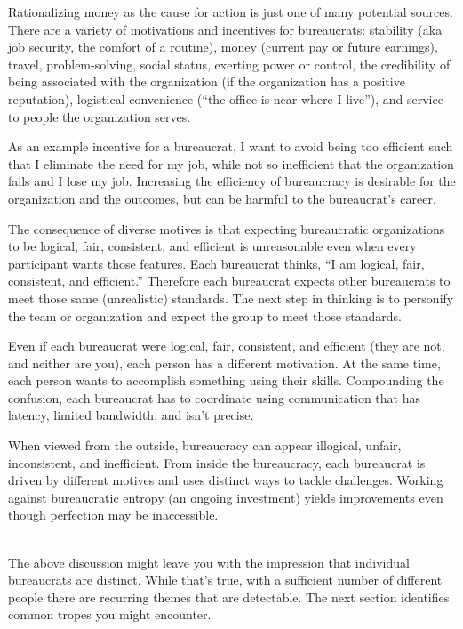 Rationalizing money as the cause for action is just one of many potential sources.
There are a variety of motivations and incentives for bureaucrats: 
stability (aka job security, the comfort of a routine),
money (current pay or future earnings), 
travel, 
problem-solving, 
social status, 
exerting power or control, 
the credibility of being associated with the organization (if the organization has a positive reputation), 
logistical convenience (``the office is near where I live''), and
service to people the organization serves.


As an example incentive for a bureaucrat, I want to avoid being too efficient such that I eliminate the need for my job, 
%
while not so inefficient that the organization fails and I lose my job. Increasing the efficiency of bureaucracy is desirable for the organization and the outcomes, but can be harmful to the bureaucrat's career.


The consequence of diverse motives is that expecting bureaucratic organizations to be logical, fair, consistent, and efficient is unreasonable even when every participant wants those features. Each bureaucrat thinks, ``I am logical, fair, consistent, and efficient.'' Therefore each bureaucrat expects other bureaucrats to meet those same (unrealistic) standards. The next step in thinking is to personify the team or organization and expect the group to meet those standards. 


Even if each bureaucrat were logical, fair, consistent, and efficient (they are not, and neither are you), each person has a different motivation. %
At the same time, each person wants to accomplish something using their skills. %
Compounding the confusion, each bureaucrat has to coordinate using communication that has latency, limited bandwidth, and isn't precise.

When viewed from the outside, bureaucracy can appear illogical, unfair, inconsistent, and inefficient. From inside the bureaucracy, each bureaucrat is driven by different motives and uses distinct ways to tackle challenges. Working against bureaucratic entropy (an ongoing investment) yields improvements even though perfection may be inaccessible.


\ \\


The above discussion might leave you with the impression that individual bureaucrats are distinct. While that's true, with a sufficient number of different people there are recurring themes that are detectable. The next section identifies common tropes you might encounter.